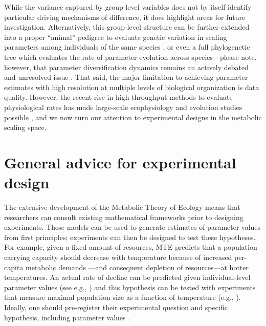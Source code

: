 \documentclass[a4paper,12pt]{article}
\begin{document}
While the variance captured by group-level variables does not by itself identify particular driving mechanisms of difference, it does highlight areas for future investigation. Alternatively, this group-level structure can be further extended into a proper ``animal'' pedigree to evaluate genetic variation in scaling parameters among individuals of the same species \cite{careau2015procb}, or even a full phylogenetic tree which evaluates the rate of parameter evolution across species---please note, however, that parameter diversification dynamics remains an actively debated and unresolved issue \cite{louca2020nature}. That said, the major limitation to achieving parameter estimates with high resolution at multiple levels of biological organization is data quality. However, the recent rise in high-throughput methods to evaluate physiological rates has made large-scale ecophysiology and evolution studies possible \cite{padfield2016ecollett, barneche2019functecol, malerba2018newphy, garzke2019plosbiol, barton2020ele}, and we now turn our attention to experimental designs in the metabolic scaling space.

\section{General advice for experimental design}

The extensive development of the Metabolic Theory of Ecology means that researchers can consult existing mathematical frameworks prior to designing experiments. These models can be used to generate estimates of parameter values from first principles; experiments can then be designed to test these hypotheses. For example, given a fixed amount of resources, MTE predicts that a population carrying capacity should decrease with temperature because of increased per-capita metabolic demands \citep{brown2004ecology, savage2004amnat, barneche2016procb}---and consequent depletion of resources---at hotter temperatures. An actual rate of decline can be predicted given individual-level parameter values (see e.g., \cite{savage2004amnat}) and this hypothesis can be tested with experiments that measure maximal population size as a function of temperature (e.g., \cite{bernhardt2018amnat, bernhardt2018procb}). Ideally, one should pre-register their experimental question and specific hypothesis, including parameter values \citep{odea2021bmcbiol}.
\end{document}
